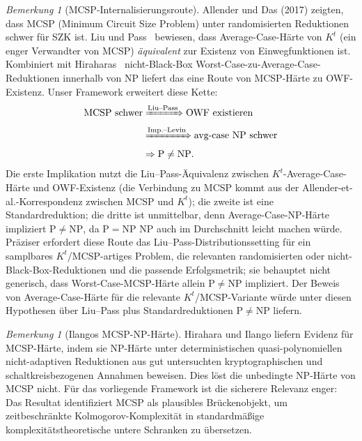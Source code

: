 \documentclass[aps,prd,twocolumn,superscriptaddress,nofootinbib]{revtex4-2}
\theoremstyle{definition}
\theoremstyle{remark}
\newtheorem{remark}[theorem]{Bemerkung}
\newcommand{\NP}{\mathrm{NP}}
\newcommand{\PP}{\mathrm{P}}
\begin{document}
\begin{remark}[MCSP-Internalisierungsroute]
\label{rem:mcsp-internalization}
Allender und Das (2017) zeigten, dass MCSP (Minimum Circuit Size Problem) unter randomisierten Reduktionen schwer für SZK ist. Liu und Pass~\cite{LiuPass2020} bewiesen, dass Average-Case-Härte von $K^t$ (ein enger Verwandter von MCSP) \emph{äquivalent} zur Existenz von Einwegfunktionen ist. Kombiniert mit Hiraharas~\cite{Hirahara2018} nicht-Black-Box Worst-Case-zu-Average-Case-Reduktionen innerhalb von NP liefert das eine Route von MCSP-Härte zu OWF-Existenz. Unser Framework erweitert diese Kette:
\[
\begin{aligned}
\text{MCSP schwer}
&\xRightarrow{\text{Liu--Pass}} \text{OWF existieren}\\
&\xRightarrow{\text{Imp.--Levin}} \text{avg-case NP schwer}\\
&\Rightarrow \PP \neq \NP .
\end{aligned}
\]
Die erste Implikation nutzt die Liu--Pass-Äquivalenz zwischen $K^t$-Average-Case-Härte und OWF-Existenz (die Verbindung zu MCSP kommt aus der Allender-et-al.-Korrespondenz zwischen MCSP und $K^t$); die zweite ist eine Standardreduktion; die dritte ist unmittelbar, denn Average-Case-NP-Härte impliziert $\PP \neq \NP$, da $\PP=\NP$ NP auch im Durchschnitt leicht machen würde. Präziser erfordert diese Route das Liu--Pass-Distributionssetting für ein samplbares $K^t$/MCSP-artiges Problem, die relevanten randomisierten oder nicht-Black-Box-Reduktionen und die passende Erfolgsmetrik; sie behauptet nicht generisch, dass Worst-Case-MCSP-Härte allein $\PP \neq \NP$ impliziert. Der Beweis von Average-Case-Härte für die relevante $K^t$/MCSP-Variante würde unter diesen Hypothesen über Liu--Pass plus Standardreduktionen $\PP \neq \NP$ liefern.
\end{remark}

\begin{remark}[Ilangos MCSP-NP-Härte]\label{rem:ilango-mcsp}
Hirahara und Ilango \cite{Ilango2025} liefern Evidenz für MCSP-Härte, indem sie NP-Härte unter deterministischen quasi-polynomiellen nicht-adaptiven Reduktionen aus gut untersuchten kryptographischen und schaltkreisbezogenen Annahmen beweisen. Dies löst die unbedingte NP-Härte von MCSP nicht. Für das vorliegende Framework ist die sicherere Relevanz enger: Das Resultat identifiziert MCSP als plausibles Brückenobjekt, um zeitbeschränkte Kolmogorov-Komplexität in standardmäßige komplexitätstheoretische untere Schranken zu übersetzen.
\end{remark}
\end{document}
